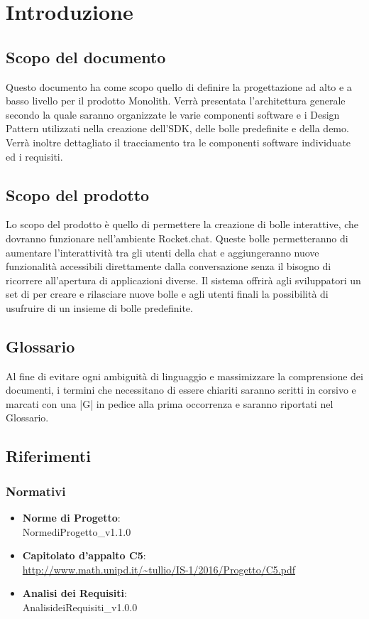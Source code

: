
\section{Introduzione}
\subsection{Scopo del documento}

Questo documento ha come scopo quello di definire la progettazione ad
alto  e a basso livello
per il prodotto Monolith. Verrà presentata l’architettura generale secondo la quale
saranno organizzate le varie componenti software e i Design Pattern utilizzati nella
creazione dell'SDK, delle bolle predefinite e della demo. Verrà inoltre dettagliato il tracciamento tra le componenti software individuate ed i requisiti.


\subsection{Scopo del prodotto}

Lo scopo del prodotto è quello di permettere la creazione di bolle
interattive, che dovranno funzionare nell’ambiente Rocket.chat. Queste
bolle permetteranno di aumentare l'interattività tra gli utenti della
chat e aggiungeranno nuove funzionalità accessibili direttamente dalla conversazione 
senza il bisogno di ricorrere all'apertura di applicazioni diverse.
Il sistema offrirà agli sviluppatori un set di  per creare e
rilasciare nuove bolle e agli utenti finali la possibilità di
usufruire di un insieme di bolle predefinite.


\subsection{Glossario}

Al fine di evitare ogni ambiguità di linguaggio e massimizzare la
comprensione dei documenti, i termini che necessitano di essere
chiariti saranno scritti in corsivo e marcati con una |G| in pedice alla prima
occorrenza e saranno riportati nel Glossario.

\subsection{Riferimenti}

\subsubsection{Normativi}
\begin{itemize}
	\item \textbf{Norme di Progetto}: \\ NormediProgetto\_v1.1.0
	\item \textbf{Capitolato d'appalto C5}: \\ \url{http://www.math.unipd.it/~tullio/IS-1/2016/Progetto/C5.pdf}
	\item \textbf{Analisi dei Requisiti}: \\ AnalisideiRequisiti\_v1.0.0
	
\end{itemize}


